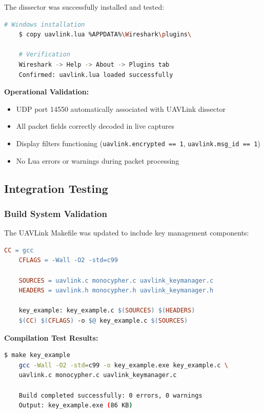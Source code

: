 \documentclass[11pt,a4paper]{article}
\begin{document}
The dissector was successfully installed and tested:
\begin{lstlisting}[language=bash,basicstyle=\ttfamily\footnotesize]
	# Windows installation
	$ copy uavlink.lua %APPDATA%\Wireshark\plugins\
	
	# Verification
	Wireshark -> Help -> About -> Plugins tab
	Confirmed: uavlink.lua loaded successfully
\end{lstlisting}

\textbf{Operational Validation:}
\begin{itemize}[noitemsep]
	\item[\textcolor{codegreen}{\textbf{PASS}}] UDP port 14550 automatically associated with UAVLink dissector
	\item[\textcolor{codegreen}{\textbf{PASS}}] All packet fields correctly decoded in live captures
	\item[\textcolor{codegreen}{\textbf{PASS}}] Display filters functioning (\texttt{uavlink.encrypted == 1}, \texttt{uavlink.msg\_id == 1})
	\item[\textcolor{codegreen}{\textbf{PASS}}] No Lua errors or warnings during packet processing
\end{itemize}

\subsection{Integration Testing}

\subsubsection{Build System Validation}

The UAVLink Makefile was updated to include key management components:

\begin{lstlisting}[language=make,basicstyle=\ttfamily\footnotesize]
	CC = gcc
	CFLAGS = -Wall -O2 -std=c99
	
	SOURCES = uavlink.c monocypher.c uavlink_keymanager.c
	HEADERS = uavlink.h monocypher.h uavlink_keymanager.h
	
	key_example: key_example.c $(SOURCES) $(HEADERS)
	$(CC) $(CFLAGS) -o $@ key_example.c $(SOURCES)
\end{lstlisting}

\textbf{Compilation Test Results:}
\begin{lstlisting}[language=bash,basicstyle=\ttfamily\footnotesize]
	$ make key_example
	gcc -Wall -O2 -std=c99 -o key_example.exe key_example.c \
	uavlink.c monocypher.c uavlink_keymanager.c
	
	Build completed successfully: 0 errors, 0 warnings
	Output: key_example.exe (86 KB)
\end{lstlisting}
\end{document}
